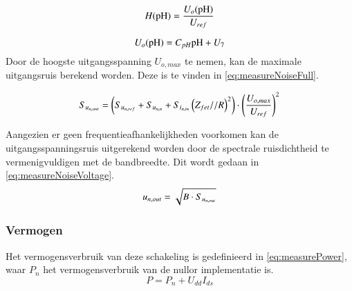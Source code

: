 \begin{equation}
    H(\mathrm{pH}) = \frac{U_o(\mathrm{pH})}{U_{ref}}
    \label{eq:measureTransfer}
\end{equation}

\begin{equation}\label{eq:measureOutVoltage}
    U_o(\ph) = C_{pH}\ph + U_7
    \tagaddtext{[\si{\volt}]}
\end{equation}
Door de hoogste uitgangsspanning $U_{o,max}$ te nemen, kan de maximale uitgangsruis berekend worden. Deze is te vinden in \cref{eq:measureNoiseFull}.

\begin{equation}\label{eq:measureNoiseFull}
    S_{u_{{n,out}}} = \left(S_{u_{{n,ref}}} + S_{u_{{n,n}}} + S_{i_{{n,in}}}\left(Z_{fet} // R\right)^2\right) \cdot \left(\frac{U_{o,max}}{U_{ref}}\right)^2
    \tagaddtext{[\si{\volt\squared\per\hertz}]}
\end{equation}

Aangezien er geen frequentieafhankelijkheden voorkomen kan de uitgangsspanningsruis uitgerekend worden door de spectrale ruisdichtheid te vermenigvuldigen met de bandbreedte. Dit wordt gedaan in \cref{eq:measureNoiseVoltage}.
\begin{equation}\label{eq:measureNoiseVoltage}
    u_{n,out} = \sqrt{B \cdot S_{u_{{n,out}}}}
    \tagaddtext{[\si{\volt}]}
\end{equation}

\subsubsection{Vermogen}
Het vermogensverbruik van deze schakeling is gedefinieerd in \cref{eq:measurePower}, waar $P_n$ het vermogensverbruik van de nullor implementatie is.
\begin{equation}\label{eq:measurePower}
    P = P_n + U_{dd}I_{ds}
\end{equation}

